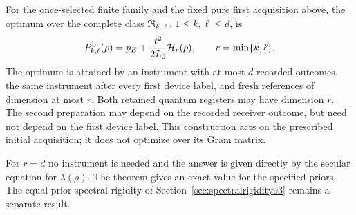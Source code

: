 \begin{theorem}\label{thm:spectralvalue94}
For the once-selected finite family and the fixed pure first acquisition
above, the optimum over the complete class $\mathfrak R_{k,\ell}$,
$1\le k,\ell\le d$, is
\begin{equation}\label{eq:spectralvalue94}
 P_{k,\ell}^{\rm b}(\rho)
       =p_E+\frac{t^2}{2L_0}\mathcal H_r(\rho),
                 \qquad r=\min\{k,\ell\}.
\end{equation}
The optimum is attained by an instrument with at most $d$ recorded
outcomes, the same instrument after every first device label, and fresh
references of dimension at most $r$.  Both retained quantum registers
may have dimension $r$.  The second preparation may depend on the
recorded receiver outcome, but need not depend on the first device
label.  This construction acts on the prescribed initial acquisition;
it does not optimize over its Gram matrix.
\end{theorem}
For $r=d$ no instrument is needed and the answer is given directly by
the secular equation for $\lambda(\rho)$.  The theorem gives an exact
value for the specified priors.  The equal-prior spectral rigidity of
Section~\ref{sec:spectralrigidity93} remains a separate result.

